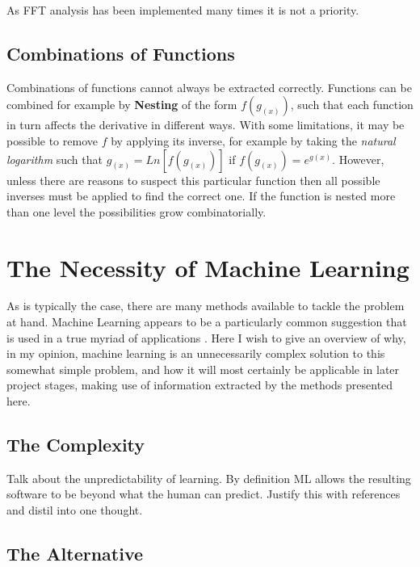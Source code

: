 \documentclass[main.tex]{subfiles}
\begin{document}
    As FFT analysis has been implemented many times it is not a priority.
    
    \subsection{Combinations of Functions}
    \label{sec:back:combFunc}
    
    Combinations of functions cannot always be extracted correctly. Functions can be combined for example by \textbf{Nesting} of the form $f(g_{(x)})$, such that each function in turn affects the derivative in different ways. With some limitations, it may be possible to remove $f$ by applying its inverse, for example by taking the \textit{natural logarithm} such that $g_{(x)}=Ln\left [ f(g_{(x)})\right ]$ if $f(g_{(x)}) = e^{g(x)}$. However, unless there are reasons to suspect this particular function then all possible inverses must be applied to find the correct one. If the function is nested more than one level the possibilities grow combinatorially. 
    
  
  \section{The Necessity of Machine Learning}
  
    As is typically the case, there are many methods available to tackle the problem at hand. Machine Learning appears to be a particularly common suggestion that is used in a true myriad of applications \cite{}. Here I wish to give an overview of why, in my opinion, machine learning is an unnecessarily complex solution to this somewhat simple problem, and how it will most certainly be applicable in later project stages, making use of information extracted by the methods presented here.
    
    \subsection{The Complexity}
    
    Talk about the unpredictability of learning. By definition ML allows the resulting software to be beyond what the human can predict. Justify this with references and distil into one thought.
    
    \subsection{The Alternative}
    
\end{document}
